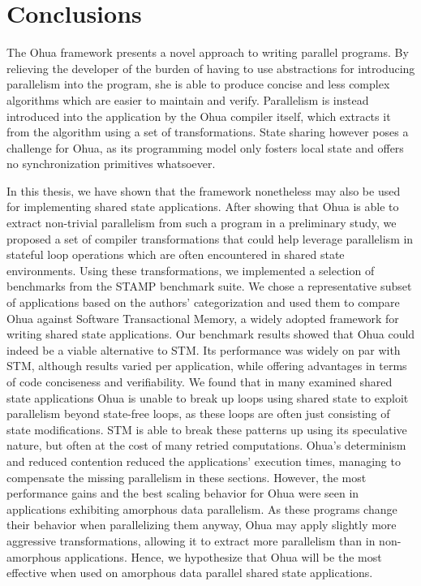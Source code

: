 %
\chapter{Conclusions}
\label{sec:conclusion}

The Ohua framework presents a novel approach to writing parallel programs.
By relieving the developer of the burden of having to use abstractions for introducing parallelism into the program, she is able to produce concise and less complex algorithms which are easier to maintain and verify.
Parallelism is instead introduced into the application by the Ohua compiler itself, which extracts it from the algorithm using a set of transformations.
State sharing however poses a challenge for Ohua, as its programming model only fosters local state and offers no synchronization primitives whatsoever.

In this thesis, we have shown that the framework nonetheless may also be used for implementing shared state applications.
After showing that Ohua is able to extract non-trivial parallelism from such a program in a preliminary study, we proposed a set of compiler transformations that could help leverage parallelism in stateful loop operations which are often encountered in shared state environments.
Using these transformations, we implemented a selection of benchmarks from the STAMP benchmark suite.
We chose a representative subset of applications based on the authors' categorization and used them to compare Ohua against Software Transactional Memory, a widely adopted framework for writing shared state applications.
Our benchmark results showed that Ohua could indeed be a viable alternative to STM.
Its performance was widely on par with STM, although results varied per application, while offering advantages in terms of code conciseness and verifiability.
We found that in many examined shared state applications Ohua is unable to break up loops using shared state to exploit parallelism beyond state-free loops, as these loops are often just consisting of state modifications.
STM is able to break these patterns up using its speculative nature, but often at the cost of many retried computations.
Ohua's determinism and reduced contention reduced the applications' execution times, managing to compensate the missing parallelism in these sections.
However, the most performance gains and the best scaling behavior for Ohua were seen in applications exhibiting amorphous data parallelism.
As these programs change their behavior when parallelizing them anyway, Ohua may apply slightly more aggressive transformations, allowing it to extract more parallelism than in non-amorphous applications.
Hence, we hypothesize that Ohua will be the most effective when used on amorphous data parallel shared state applications.

